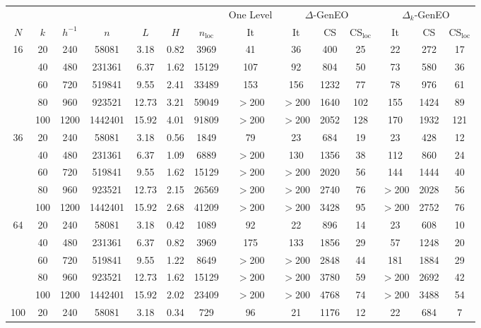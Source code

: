 \documentclass[preprint,3p,times]{elsarticle}
\theoremstyle{definition}
\numberwithin{equation}{section}
\begin{document}
{\begin{table}[H]
    \centering
\hspace*{-2cm}
\begin{tabular}{ccccccc|c|ccc|ccc}
\multicolumn{7}{c|}{} & One Level & \multicolumn{3}{c}{$\Delta$-GenEO} & \multicolumn{3}{c}{$\Delta_k$-GenEO} \\
$N$ & $k$ & $h^{-1}$ & $n$ & $L$ & $H$ & $n_\text{loc}$ & It & It & CS & CS$_\text{loc}$ & It & CS & CS$_\text{loc}$  \\
\hline
16 & 20 & 240 & 58081 & 3.18 & 0.82 & 3969 & 41 & 36 & 400 & 25 & 22 & 272 & 17 \\
 & 40 & 480 & 231361 &  6.37 & 1.62 & 15129 & 107 & 92 & 804 & 50 & 73 & 580 & 36 \\
 & 60 & 720 & 519841 &  9.55 & 2.41 & 33489 & 153 & 156 & 1232 & 77 & 78 & 976 & 61 \\
 & 80 & 960 & 923521 &  12.73 & 3.21 & 59049 & $>$200 & $>$200 & 1640 & 102 & 155 & 1424 & 89 \\
 & 100 & 1200 & 1442401 &  15.92 & 4.01 & 91809 & $>$200 & $>$200 & 2052 & 128 & 170 & 1932 & 121 \\
\hline
36 & 20 & 240 & 58081 & 3.18 & 0.56 & 1849 & 79 & 23 & 684 & 19 & 23 & 428 & 12 \\
 & 40 & 480 & 231361 &  6.37 & 1.09 & 6889 & $>$200 & 130 & 1356 & 38 & 112 & 860 & 24 \\
 & 60 & 720 & 519841 &  9.55 & 1.62 & 15129 & $>$200 & $>$200 & 2020 & 56 & 144 & 1444 & 40 \\
 & 80 & 960 & 923521 &  12.73 & 2.15 & 26569 & $>$200 & $>$200 & 2740 & 76 & $>$200 & 2028 & 56 \\
 & 100 & 1200 & 1442401 &  15.92 & 2.68 & 41209 & $>$200 & $>$200 & 3428 & 95 & $>$200 & 2752 & 76 \\
\hline
64 & 20 & 240 & 58081 & 3.18 & 0.42 & 1089 & 92 & 22 & 896 & 14 & 23 & 608 & 10 \\
 & 40 & 480 & 231361 &  6.37 & 0.82 & 3969 & 175 & 133 & 1856 & 29 & 57 & 1248 & 20 \\
 & 60 & 720 & 519841 &  9.55 & 1.22 & 8649 & $>$200 & $>$200 & 2848 & 44 & 181 & 1884 & 29 \\
 & 80 & 960 & 923521 &  12.73 & 1.62 & 15129 & $>$200 & $>$200 & 3780 & 59 & $>$200 & 2692 & 42 \\
 & 100 & 1200 & 1442401 &  15.92 & 2.02 & 23409 & $>$200 & $>$200 & 4768 & 74 & $>$200 & 3488 & 54 \\
\hline
100 & 20 & 240 & 58081 & 3.18 & 0.34 & 729 & 96 & 21 & 1176 & 12 & 22 & 684 & 7 \\

\end{tabular}
\end{table}}
\end{document}
